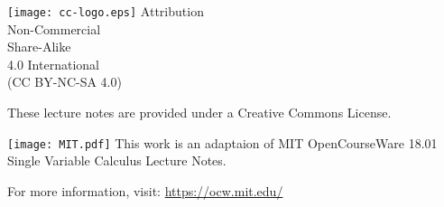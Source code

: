\documentclass[./main.tex]{subfiles}
\begin{document}
\thispagestyle{empty}

\phantom{text}
\vfill
\texttt{[image: cc-logo.eps]}
\scriptsize
Attribution\\
Non-Commercial\\
Share-Alike\\
4.0 International\\
(CC BY-NC-SA 4.0)

\small
These lecture notes are provided under a Creative Commons License.
\vspace{1cm}

\texttt{[image: MIT.pdf]}
This work is an adaptaion of 
MIT OpenCourseWare 18.01 Single Variable Calculus Lecture Notes.

For more information, visit: \url{https://ocw.mit.edu/}
\end{document}
